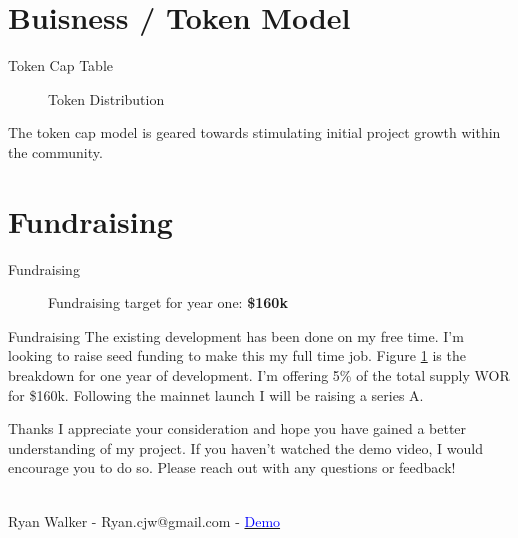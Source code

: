 \documentclass[final, xcolor=pdftex, dvipsnames, table, aspectratio=169, 14pt]{beamer}
\begin{document}
\section{Buisness / Token Model}
\begin{frame}{Token Cap Table}


\begin{figure}[H]
\begin{center}
\caption{Token Distribution}
\end{center}
\end{figure}
The token cap model is geared towards stimulating initial project growth within the community.
\end{frame}

\section{Fundraising}
\begin{frame}{Fundraising}

\begin{figure}[H]
\begin{center}
\caption{Fundraising target for year one: \textbf{\$160k}}
\label{funding}
\end{center}
\end{figure}

\end{frame}
\begin{frame}{Fundraising}
The existing development has been done on my free time. I'm looking to raise seed funding to make this my full time job. Figure \ref{funding} is the breakdown for one year of development. I'm offering 5\% of the total supply WOR for \$160k. Following the mainnet launch I will be raising a series A.
\end{frame}

\begin{frame}{Thanks}
I appreciate your consideration and hope you have gained a better understanding of my project. If you haven't watched the demo video, I would encourage you to do so. Please reach out with any questions or feedback!
\\~\\
\begin{center}
Ryan Walker - Ryan.cjw@gmail.com - \href{https://www.youtube.com/watch?v=OrOZVr-j92A}{\textcolor{blue}{Demo}}
\end{center}
\end{frame}
\end{document}
